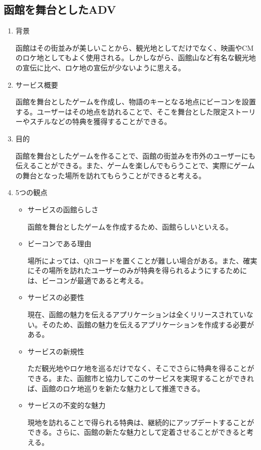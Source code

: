 \subsection{函館を舞台としたADV}
\begin{enumerate}
    \item 背景
    \par 函館はその街並みが美しいことから、観光地としてだけでなく、映画やCMのロケ地としてもよく使用される。しかしながら、函館山など有名な観光地の宣伝に比べ、ロケ地の宣伝が少ないように思える。
    \item サービス概要
    \par 函館を舞台としたゲームを作成し、物語のキーとなる地点にビーコンを設置する。ユーザーはその地点を訪れることで、そこを舞台とした限定ストーリーやスチルなどの特典を獲得することができる。
    \item 目的
    \par 函館を舞台としたゲームを作ることで、函館の街並みを市外のユーザーにも伝えることができる。また、ゲームを楽しんでもらうことで、実際にゲームの舞台となった場所を訪れてもらうことができると考える。
    \item 5つの観点
    \begin{itemize}
        \item サービスの函館らしさ
        \par 函館を舞台としたゲームを作成するため、函館らしいといえる。
        \item ビーコンである理由
        \par 場所によっては、QRコードを置くことが難しい場合がある。また、確実にその場所を訪れたユーザーのみが特典を得られるようにするためには、ビーコンが最適であると考える。
        \item サービスの必要性
        \par 現在、函館の魅力を伝えるアプリケーションは全くリリースされていない。そのため、函館の魅力を伝えるアプリケーションを作成する必要がある。
        \item サービスの新規性
        \par ただ観光地やロケ地を巡るだけでなく、そこでさらに特典を得ることができる。また、函館市と協力してこのサービスを実現することができれば、函館のロケ地巡りを新たな魅力として推進できる。
        \item サービスの不変的な魅力
        \par 現地を訪れることで得られる特典は、継続的にアップデートすることができる。さらに、函館の新たな魅力として定着させることができると考える。
    \end{itemize}
\end{enumerate}

